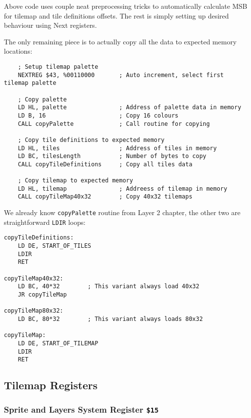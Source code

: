 Above code uses couple neat preprocessing tricks to automatically calculate MSB for tilemap and tile definitions offsets. The rest is simply setting up desired behaviour using Next registers.

\pagebreak
The only remaining piece is to actually copy all the data to expected memory locations:

\begin{lstlisting}
    ; Setup tilemap palette
    NEXTREG $43, %00110000       ; Auto increment, select first tilemap palette

    ; Copy palette
    LD HL, palette               ; Address of palette data in memory
    LD B, 16                     ; Copy 16 colours
    CALL copyPalette             ; Call routine for copying

    ; Copy tile definitions to expected memory
    LD HL, tiles                 ; Address of tiles in memory
    LD BC, tilesLength           ; Number of bytes to copy
    CALL copyTileDefinitions     ; Copy all tiles data

    ; Copy tilemap to expected memory
    LD HL, tilemap               ; Addreess of tilemap in memory
    CALL copyTileMap40x32        ; Copy 40x32 tilemaps
\end{lstlisting}

We already know {\tt copyPalette} routine from Layer 2 chapter, the other two are straightforward {\tt LDIR} loops:

\begin{lstlisting}
copyTileDefinitions:
    LD DE, START_OF_TILES
    LDIR
    RET

copyTileMap40x32:
    LD BC, 40*32		; This variant always load 40x32
    JR copyTileMap

copyTileMap80x32:
    LD BC, 80*32		; This variant always loads 80x32

copyTileMap:
    LD DE, START_OF_TILEMAP
    LDIR
    RET
\end{lstlisting}


\pagebreak
\subsection{Tilemap Registers}
\label{zx_next_tilemap_registers}

\subsubsection{Sprite and Layers System Register {\tt \$15}}


